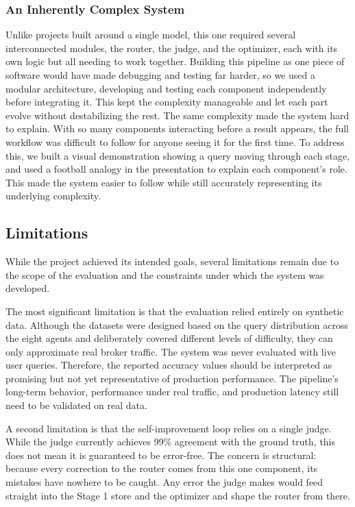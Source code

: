 \subsubsection{An Inherently Complex System}\label{sec:challenge-complexity}

Unlike projects built around a single model, this one required several interconnected modules, the router, the judge, and the optimizer, each with its own logic but all needing to work together. Building this pipeline as one piece of software would have made debugging and testing far harder, so we used a modular architecture, developing and testing each component independently before integrating it. This kept the complexity manageable and let each part evolve without destabilizing the rest. The same complexity made the system hard to explain. With so many components interacting before a result appears, the full workflow was difficult to follow for anyone seeing it for the first time. To address this, we built a visual demonstration showing a query moving through each stage, and used a football analogy in the presentation to explain each component's role. This made the system easier to follow while still accurately representing its underlying complexity.

\subsection{Limitations}\label{sec:limitations}

While the project achieved its intended goals, several limitations remain due to the scope of the evaluation and the constraints under which the system was developed.

The most significant limitation is that the evaluation relied entirely on synthetic data. Although the datasets were designed based on the query distribution across the eight agents and deliberately covered different levels of difficulty, they can only approximate real broker traffic. The system was never evaluated with live user queries. Therefore, the reported accuracy values should be interpreted as promising but not yet representative of production performance. The pipeline's long-term behavior, performance under real traffic, and production latency still need to be validated on real data.

A second limitation is that the self-improvement loop relies on a single judge. While the judge currently achieves 99\% agreement with the ground truth, this does not mean it is guaranteed to be error-free. The concern is structural: because every correction to the router comes from this one component, its mistakes have nowhere to be caught. Any error the judge makes would feed straight into the Stage 1 store and the optimizer and shape the router from there.

